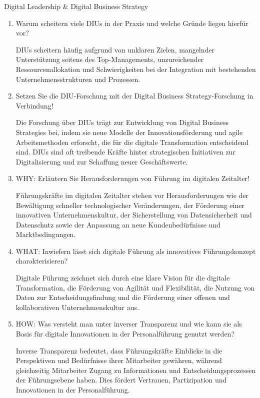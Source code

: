 \documentclass{article}
\begin{document}
\begin{exercise}{Digital Leadership \& Digital Business Strategy}
\begin{enumerate}
    \item Warum scheitern viele DIUs in der Praxis und welche Gründe liegen hierfür vor?
          \begin{solution}
            DIUs scheitern häufig aufgrund von unklaren Zielen, mangelnder Unterstützung seitens des Top-Managements, unzureichender Ressourcenallokation und Schwierigkeiten bei der Integration mit bestehenden Unternehmensstrukturen und Prozessen.
          \end{solution}

    \item Setzen Sie die DIU-Forschung mit der Digital Business Strategy-Forschung in Verbindung!
          \begin{solution}
            Die Forschung über DIUs trägt zur Entwicklung von Digital Business Strategies bei, indem sie neue Modelle der Innovationsförderung und agile Arbeitsmethoden erforscht, die für die digitale Transformation entscheidend sind. DIUs sind oft treibende Kräfte hinter strategischen Initiativen zur Digitalisierung und zur Schaffung neuer Geschäftswerte.
          \end{solution}

    \item WHY: Erläutern Sie Herausforderungen von Führung im digitalen Zeitalter!
          \begin{solution}
            Führungskräfte im digitalen Zeitalter stehen vor Herausforderungen wie der Bewältigung schneller technologischer Veränderungen, der Förderung einer innovativen Unternehmenskultur, der Sicherstellung von Datensicherheit und Datenschutz sowie der Anpassung an neue Kundenbedürfnisse und Marktbedingungen.
          \end{solution}

    \item WHAT: Inwiefern lässt sich digitale Führung als innovatives Führungskonzept charakterisieren?
          \begin{solution}
            Digitale Führung zeichnet sich durch eine klare Vision für die digitale Transformation, die Förderung von Agilität und Flexibilität, die Nutzung von Daten zur Entscheidungsfindung und die Förderung einer offenen und kollaborativen Unternehmenskultur aus.
          \end{solution}
    \item HOW: Was versteht man unter inverser Transparenz und wie kann sie als Basis für digitale Innovationen in der Personalführung genutzt werden?
          \begin{solution}
            Inverse Transparenz bedeutet, dass Führungskräfte Einblicke in die Perspektiven und Bedürfnisse ihrer Mitarbeiter gewähren, während gleichzeitig Mitarbeiter Zugang zu Informationen und Entscheidungsprozessen der Führungsebene haben. Dies fördert Vertrauen, Partizipation und Innovationen in der Personalführung.
          \end{solution}


\end{enumerate}
\end{exercise}
\end{document}
